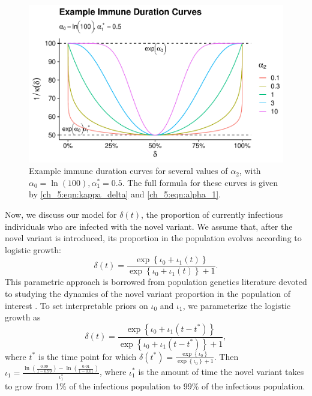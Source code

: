 \begin{figure}
    \centering
    \includegraphics[width=1.0\columnwidth]{example_immune_durration_plot.pdf}
    \caption[Example immune duration curves.]{Example immune duration curves for several values of \( \alpha_2 \), with \( \alpha_0 = \ln\left(100\right), \alpha_1^* = 0.5 \).
    The full formula for these curves is given by \eqref{ch_5:eqn:kappa_delta} and \eqref{ch_5:eqn:alpha_1}.}
    \label{ch_5:fig:example_immune_durration_plot}
\end{figure}

Now, we discuss our model for \( \delta(t) \), the proportion of currently infectious individuals who are infected with the novel variant.
We assume that, after the novel variant is introduced, its proportion in the population evolves according to logistic growth:
\begin{equation}
    \delta(t) = \frac{\exp \left\{ \iota_0 + \iota_1 \left( t \right) \right\}}{\exp \left\{ \iota_0 + \iota_1 \left( t \right) \right\} + 1}.
    \label{ch_5:eqn:logistic_growth}
\end{equation}
This parametric approach is borrowed from population genetics literature devoted to studying the dynamics of the novel variant proportion in the population of interest \citep{Lacerda2014Population, Zhao2023mechanism}.
To set interpretable priors on \( \iota_0 \) and \( \iota_1 \), we parameterize the logistic growth as 
\begin{equation}
    \delta(t) = \frac{\exp \left\{ \iota_0 + \iota_1 \left( t - t^* \right) \right\}}{\exp \left\{ \iota_0 + \iota_1 \left( t - t^* \right) \right\} + 1},
\end{equation}
where \( t^* \) is the time point for which \( \delta(t^*) = \frac{ \exp \left\{ \iota_0 \right\} }{\exp \left\{ \iota_0 \right\} + 1} \).
Then \( \iota_1 = \frac{\ln \left( \frac{0.99}{1 - 0.99} \right) - \ln \left( \frac{0.01}{1 - 0.01} \right)}{\iota_1^*} \), where \( \iota_1^* \) is the amount of time the novel variant takes to grow from 1\% of the infectious population to 99\% of the infectious population.

